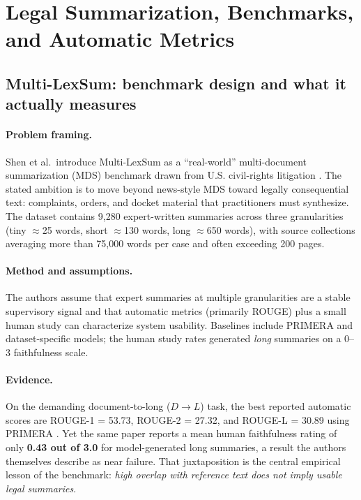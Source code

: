 \section{Legal Summarization, Benchmarks, and Automatic Metrics}
\label{sec:lit-summarization}

\subsection{Multi-LexSum: benchmark design and what it actually measures}
\label{sec:lit-multilexsum}

\paragraph{Problem framing.}
Shen et al.\ introduce Multi-LexSum as a ``real-world'' multi-document summarization (MDS) benchmark drawn from U.S. civil-rights litigation \cite{shen2022multilexsum}. The stated ambition is to move beyond news-style MDS toward legally consequential text: complaints, orders, and docket material that practitioners must synthesize. The dataset contains 9,280 expert-written summaries across three granularities (tiny $\approx$25 words, short $\approx$130 words, long $\approx$650 words), with source collections averaging more than 75{,}000 words per case and often exceeding 200 pages.

\paragraph{Method and assumptions.}
The authors assume that expert summaries at multiple granularities are a stable supervisory signal and that automatic metrics (primarily ROUGE) plus a small human study can characterize system usability. Baselines include PRIMERA and dataset-specific models; the human study rates generated \emph{long} summaries on a 0--3 faithfulness scale.

\paragraph{Evidence.}
On the demanding document-to-long ($D \rightarrow L$) task, the best reported automatic scores are ROUGE-1 = 53.73, ROUGE-2 = 27.32, and ROUGE-L = 30.89 using PRIMERA \cite{shen2022multilexsum,xiao2022primera}. Yet the same paper reports a mean human faithfulness rating of only \textbf{0.43 out of 3.0} for model-generated long summaries, a result the authors themselves describe as near failure. That juxtaposition is the central empirical lesson of the benchmark: \emph{high overlap with reference text does not imply usable legal summaries}.

